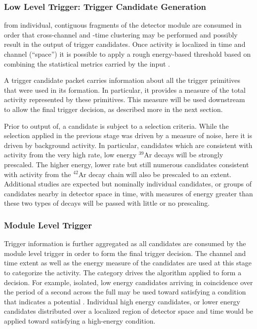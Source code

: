 
\subsubsection{Low Level Trigger: Trigger Candidate Generation}

 from individual, contiguous fragments of the detector
module are consumed in order that cross-channel and -time clustering may be
performed and possibly result in the output of trigger candidates.
Once activity is localized in time and channel (``space'') it is
possible to apply a rough energy-based threshold based on combining the
statistical metrics carried by the input .

A trigger candidate packet carries information about all the trigger
primitives that were used in its formation. 
In particular, it provides a measure of the total activity represented
by these primitives.
This measure will be used downstream to allow the final trigger
decision, as described more in the next section.

Prior to output of, a candidate is subject to a selection criteria.
While the selection applied in the previous stage was driven by a
measure of noise, here it is driven by background activity.  
In particular, candidates which are consistent with activity from the
very high rate, low energy $^{39}$Ar decays will be strongly prescaled. 
The higher energy, lower rate but still numerous candidates consistent
with activity from the $^{42}$Ar decay chain will also be prescaled to
an extent. 
Additional studies are expected but nominally individual candidates, or
groups of candidates nearby in detector space in time, with measures of
energy greater than these two types of decays will be passed with little
or no prescaling.


\subsubsection{Module Level Trigger}

Trigger information is further aggregated as all candidates are consumed
by the module level trigger in order to form the final trigger decision. 
The channel and time extent as well as the energy measure of the
candidates are used at this stage to categorize the activity. 
The category drives the algorithm applied to form a decision.
For example, isolated, low energy candidates arriving in coincidence
over the period of a second across the full  may be used toward
satisfying a condition that indicates a potential . 
Individual high energy candidates, or lower energy candidates
distributed over a localized region of detector space and time would be
applied toward satisfying a high-energy condition. 

